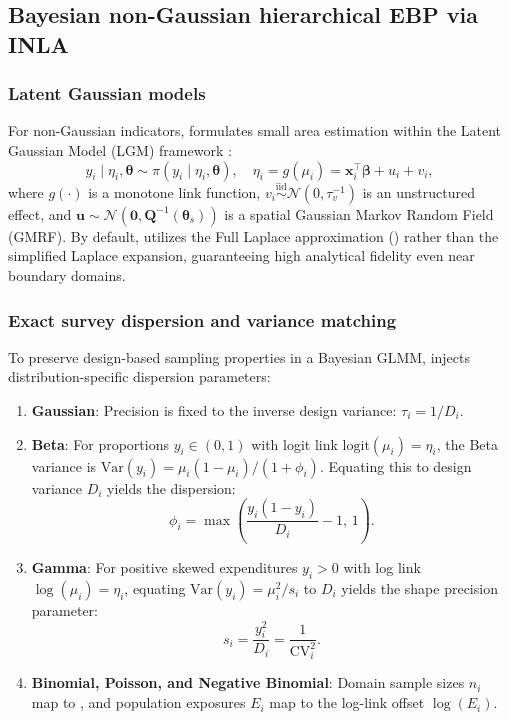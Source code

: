 \documentclass[article]{jss}
\begin{document}
\subsection{Bayesian non-Gaussian hierarchical EBP via INLA} \label{sec:methods_inla}

\subsubsection{Latent Gaussian models}
For non-Gaussian indicators,  formulates small area estimation within the Latent Gaussian Model (LGM) framework \citep{rue2009approximate}:
%
\begin{equation} \label{eq:lgm_formulation}
y_i \mid \eta_i, \bm{\theta} \sim \pi(y_i \mid \eta_i, \bm{\theta}), \quad \eta_i = g(\mu_i) = \bm{x}_i^\top \bm{\beta} + u_i + v_i,
\end{equation}
%
where $g(\cdot)$ is a monotone link function, $v_i \overset{\mathrm{iid}}{\sim} \mathcal{N}(0, \tau_v^{-1})$ is an unstructured effect, and $\bm{u} \sim \mathcal{N}(\bm{0}, \bm{Q}^{-1}(\bm{\theta}_s))$ is a spatial Gaussian Markov Random Field (GMRF). By default,  utilizes the Full Laplace approximation () rather than the simplified Laplace expansion, guaranteeing high analytical fidelity even near boundary domains.

\subsubsection{Exact survey dispersion and variance matching}
To preserve design-based sampling properties in a Bayesian GLMM,  injects distribution-specific dispersion parameters:
%
\begin{enumerate}
  \item \textbf{Gaussian}: Precision is fixed to the inverse design variance: $\tau_i = 1/D_i$.
  \item \textbf{Beta}: For proportions $y_i \in (0, 1)$ with logit link $\mathrm{logit}(\mu_i) = \eta_i$, the Beta variance is $\mathrm{Var}(y_i) = \mu_i(1 - \mu_i)/(1 + \phi_i)$. Equating this to design variance $D_i$ yields the \citet{janicki2020properties} dispersion:
  \begin{equation} \label{eq:beta_dispersion}
  \phi_i = \max\left( \frac{y_i (1 - y_i)}{D_i} - 1, \, 1 \right).
  \end{equation}
  \item \textbf{Gamma}: For positive skewed expenditures $y_i > 0$ with log link $\log(\mu_i) = \eta_i$, equating $\mathrm{Var}(y_i) = \mu_i^2 / s_i$ to $D_i$ yields the shape precision parameter:
  \begin{equation}
  s_i = \frac{y_i^2}{D_i} = \frac{1}{\mathrm{CV}_i^2}.
  \end{equation}
  \item \textbf{Binomial, Poisson, and Negative Binomial}: Domain sample sizes $n_i$ map to , and population exposures $E_i$ map to the log-link offset $\log(E_i)$.
\end{enumerate}
\end{document}
